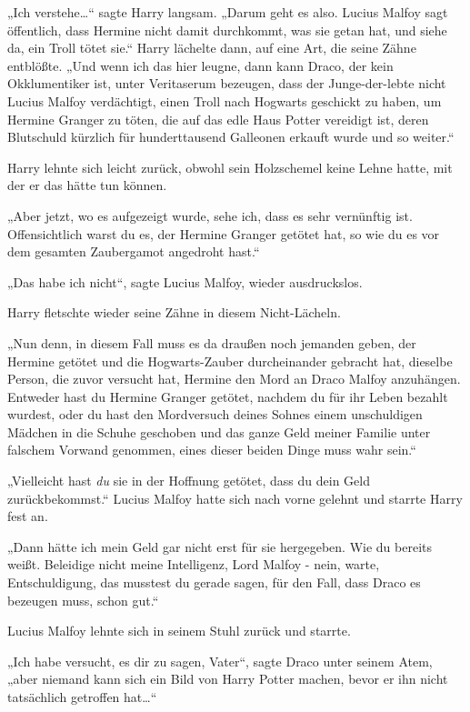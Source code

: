 {„Ich verstehe…“ sagte Harry langsam. „Darum geht es also. Lucius Malfoy sagt öffentlich, dass Hermine nicht damit durchkommt, was sie getan hat, und siehe da, ein Troll tötet sie.“ Harry lächelte dann, auf eine Art, die seine Zähne entblößte. „Und wenn ich das hier leugne, dann kann Draco, der kein Okklumentiker ist, unter Veritaserum bezeugen, dass der Junge-der-lebte nicht Lucius Malfoy verdächtigt, einen Troll nach Hogwarts geschickt zu haben, um Hermine Granger zu töten, die auf das edle Haus Potter vereidigt ist, deren Blutschuld kürzlich für hunderttausend Galleonen erkauft wurde und so weiter.“

Harry lehnte sich leicht zurück, obwohl sein Holzschemel keine Lehne hatte, mit der er das hätte tun können.

„Aber jetzt, wo es aufgezeigt wurde, sehe ich, dass es sehr vernünftig ist. Offensichtlich warst du es, der Hermine Granger getötet hat, so wie du es vor dem gesamten Zaubergamot angedroht hast.“

„Das habe ich nicht“, sagte Lucius Malfoy, wieder ausdruckslos.

Harry fletschte wieder seine Zähne in diesem Nicht-Lächeln.

„Nun denn, in diesem Fall muss es da draußen noch jemanden geben, der Hermine getötet und die Hogwarts-Zauber durcheinander gebracht hat, dieselbe Person, die zuvor versucht hat, Hermine den Mord an Draco Malfoy anzuhängen. Entweder hast du Hermine Granger getötet, nachdem du für ihr Leben bezahlt wurdest, oder du hast den Mordversuch deines Sohnes einem unschuldigen Mädchen in die Schuhe geschoben und das ganze Geld meiner Familie unter falschem Vorwand genommen, eines dieser beiden Dinge muss wahr sein.“

„Vielleicht hast \emph{du} sie in der Hoffnung getötet, dass du dein Geld zurückbekommst.“ Lucius Malfoy hatte sich nach vorne gelehnt und starrte Harry fest an.

„Dann hätte ich mein Geld gar nicht erst für sie hergegeben. Wie du bereits weißt. Beleidige nicht meine Intelligenz, Lord Malfoy - nein, warte, Entschuldigung, das musstest du gerade sagen, für den Fall, dass Draco es bezeugen muss, schon gut.“

Lucius Malfoy lehnte sich in seinem Stuhl zurück und starrte.

„Ich habe versucht, es dir zu sagen, Vater“, sagte Draco unter seinem Atem, „aber niemand kann sich ein Bild von Harry Potter machen, bevor er ihn nicht tatsächlich getroffen hat…“

}
